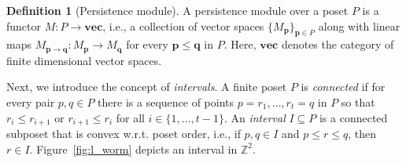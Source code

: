 \documentclass{article}
\newcommand{\zz}{\mathbb{ZZ}}
\newcommand{\z}{\mathbb{Z}}
\theoremstyle{plain}
\theoremstyle{definition}
\newtheorem{definition}[theorem]{Definition}
\theoremstyle{remark}
\begin{document}
\begin{definition}[Persistence module]
    A persistence module over a poset $P$ is a functor $M \colon P \to \mathbf{vec}$, i.e., a collection of vector spaces $\{M_\mathbf{p}\}_{\mathbf{p}\in P}$ along with linear maps $M_{\mathbf{p} \to \mathbf{q}} \colon M_{\mathbf{p}} \to M_{\mathbf{q}}$ for every $\mathbf{p} \leq \mathbf{q}$ in $P$. Here, $\mathbf{vec}$ denotes the category of finite dimensional vector spaces.
    \label{def:qzzpersmod}
\end{definition}

Next, we introduce the concept of \emph{intervals}. A finite poset $P$ is \emph{connected} if for every pair $p,q \in P$ there is a sequence of points $p=r_1,\ldots, r_t=q$ in $P$ so that $r_i \leq r_{i+1}$ or $r_{i+1}\leq r_i$ for all $i\in \{1,\ldots,t-1\}$. An \emph{interval} $I \subseteq P$ is a connected subposet that is convex w.r.t. poset order, i.e., if $p,q\in I$ and $p\leq r\leq q$, then $r \in I$.  Figure~\ref{fig:l_worm} depicts an interval in $\z^2$.

\end{document}
